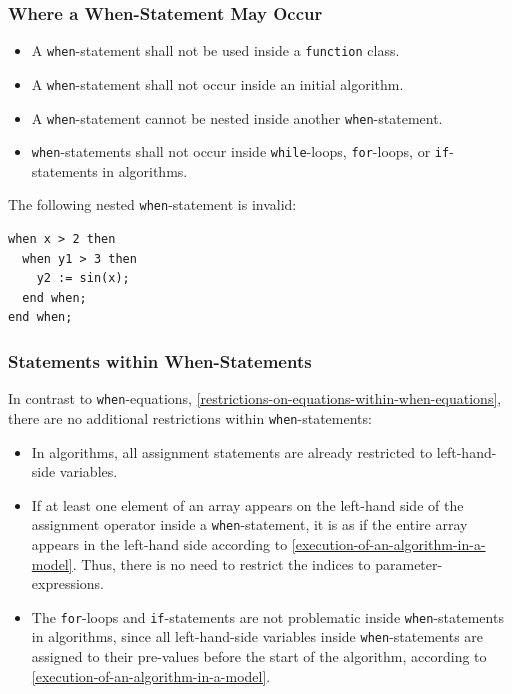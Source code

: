 \subsubsection{Where a When-Statement May Occur}\label{restrictions-on-where-a-when-statement-may-occur}\label{where-a-when-statement-may-occur}

\begin{itemize}
\item
  A \lstinline!when!-statement shall not be used inside a \lstinline!function! class.
\item
  A \lstinline!when!-statement shall not occur inside an initial algorithm.
\item
  A \lstinline!when!-statement cannot be nested inside another \lstinline!when!-statement.
\item
  \lstinline!when!-statements shall not occur inside \lstinline!while!-loops, \lstinline!for!-loops, or \lstinline!if!-statements in algorithms.
\end{itemize}

\begin{example}
The following nested \lstinline!when!-statement is invalid:
\begin{lstlisting}[language=modelica]
when x > 2 then
  when y1 > 3 then
    y2 := sin(x);
  end when;
end when;
\end{lstlisting}
\end{example}

\subsubsection{Statements within When-Statements}\label{restrictions-on-statements-within-when-statements}\label{statements-within-when-statements}

\begin{nonnormative}
In contrast to \lstinline!when!-equations, \cref{restrictions-on-equations-within-when-equations}, there are no additional restrictions within \lstinline!when!-statements:
\begin{itemize}
\item
  In algorithms, all assignment statements are already restricted to left-hand-side variables.
\item
  If at least one element of an array appears on the left-hand side of the assignment operator inside a \lstinline!when!-statement, it is as if the entire array appears in the left-hand side according to \cref{execution-of-an-algorithm-in-a-model}.
  Thus, there is no need to restrict the indices to parameter-expressions.
\item
  The \lstinline!for!-loops and \lstinline!if!-statements are not problematic inside \lstinline!when!-statements in algorithms, since all left-hand-side variables inside \lstinline!when!-statements are assigned to their pre-values before the start of the algorithm, according to \cref{execution-of-an-algorithm-in-a-model}.
\end{itemize}
\end{nonnormative}

